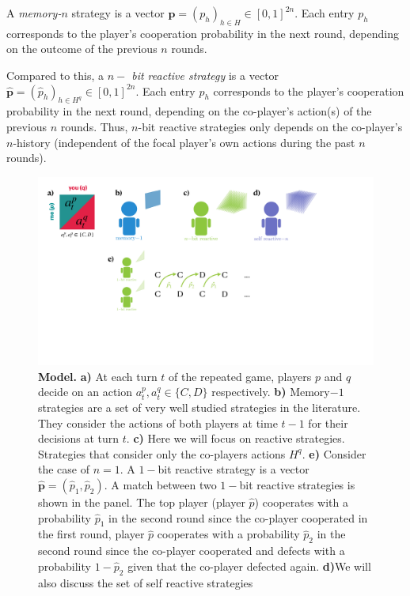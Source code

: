 \documentclass{article}
\theoremstyle{definition}
\begin{document}
A {\it memory-$n$} strategy is a vector $\mathbf{p}=(p_h)_{h\in
H}\in[0,1]^{2n}$. Each entry $p_h$ corresponds to the player's cooperation
probability in the next round, depending on the outcome of the previous $n$
rounds.

Compared to this, a {\it $n-$ bit reactive strategy} is a vector
$\mathbf{\hat{p}}=(\hat{p}_h)_{h\in H^q}\in[0,1]^{2n}$. Each entry $p_h$
corresponds to the player's cooperation probability in the next round, depending
on the co-player's action(s) of the previous $n$ rounds. Thus, $n$-bit reactive
strategies only depends on the co-player's $n$-history (independent of the focal
player's own actions during the past $n$ rounds).

\begin{figure}[h!]
    \centering
    \includegraphics[width=\textwidth]{figures/conceptual_figure_model.pdf}
    \caption{\textbf{Model.} \textbf{a)} At each turn $t$ of the repeated game,
    players \(p\) and \(q\) decide on an action \(a^{p}_{t}, a^{q}_{t} \in \{C,
    D\}\) respectively. \textbf{b)} Memory$-1$ strategies are a set of very well
    studied strategies in the literature. They consider the actions of both
    players at time $t-1$ for their decisions at turn $t$. \textbf{c)} Here we
    will focus on reactive strategies. Strategies that consider only the
    co-players actions $H^q$. \textbf{e)} Consider the case of $n=1$. A $1-$bit
    reactive strategy is a vector $\mathbf{\hat{p}}=(\hat{p}_1, \hat{p}_2)$. A
    match between two $1-$bit reactive strategies is shown in the panel. The top
    player (player $\hat{p}$) cooperates with a probability $\hat{p}_1$ in the
    second round since the co-player cooperated in the first round, player
    $\hat{p}$ cooperates with a probability $\hat{p}_2$ in the second round
    since the co-player cooperated and defects with a probability $1 -
    \hat{p}_2$ given that the co-player defected again. \textbf{d)}We will also
    discuss the set of self reactive strategies}
\end{figure}
\end{document}
